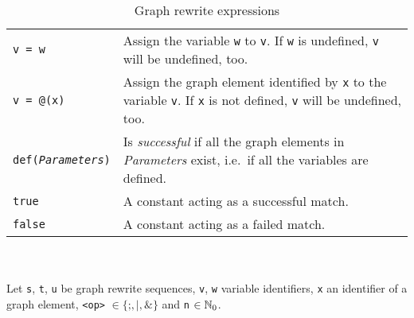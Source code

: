 \begin{table}[htbp]
\begin{minipage}{\linewidth}
\begin{tabularx}{\linewidth}{|lX|}
\texttt{v = w}	& Assign the variable \texttt{w} to \texttt{v}. If \texttt{w} is undefined, \texttt{v} will be undefined, too.\\
\texttt{v = @(x)}	& Assign the graph element identified by \texttt{x} to the variable \texttt{v}. If \texttt{x} is not defined, \texttt{v} will be undefined, too.\\
\texttt{def(\emph{Parameters})} & Is \emph{successful} if all the graph elements in \emph{Parameters} exist, i.e.\ if all the variables are defined.\\
\texttt{true}	& A constant acting as a successful match.\\
\texttt{false}	& A constant acting as a failed match.\\ \hline
\end{tabularx}\indexmain{\texttt{;}}
\indexmain{\texttt{\&}}\indexmain{\texttt{*}}
\end{minipage}\\
\\ 
{\small Let \texttt{s}, \texttt{t}, \texttt{u} be graph rewrite sequences, \texttt{v}, \texttt{w} variable identifiers, \texttt{x} an identifier of a graph element, \texttt{<op>} $\in \{\texttt{;}, \texttt{|}, \texttt{\&}\}$ and \texttt{n} $\in \mathbb{N}_0$.}
\caption{Graph rewrite expressions}
\label{grsruletab}
\end{table}
\makeatother
